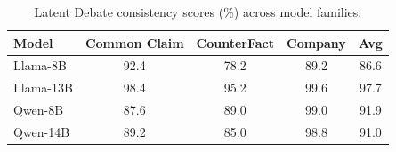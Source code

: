 \begin{table}[t]
    \centering
    \tiny
    \setlength{\tabcolsep}{3mm}
    \begin{tabular}{lcccc}
        \toprule
        \textbf{Model} & \textbf{Common Claim} & \textbf{CounterFact} & \textbf{Company} & \textbf{Avg}\\
        \midrule
        Llama-8B &92.4&78.2&89.2&86.6\\
        Llama-13B &98.4&95.2&99.6&97.7\\
        Qwen-8B &87.6&89.0&99.0&91.9\\
        Qwen-14B &89.2&85.0&98.8&91.0\\
        \bottomrule
    \end{tabular}
    \caption{Latent Debate consistency scores (\%) across model families.}
    \label{tab:qwen_extension}
\end{table}

